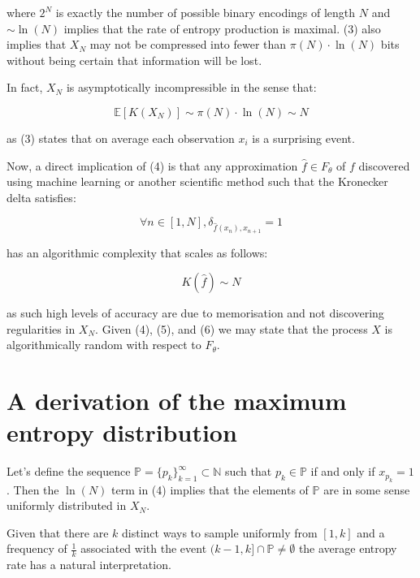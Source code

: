 \documentclass{article}
\begin{document}
where $2^N$ is exactly the number of possible binary encodings of length $N$ and 
$\sim \ln(N)$ implies that the rate of entropy production is maximal. (3) also implies that $X_N$ may not be compressed into fewer than $\pi(N) \cdot \ln(N)$ bits without being certain that information will be lost. 

In fact, $X_N$ is asymptotically incompressible in the sense that: 

\begin{equation}
\mathbb{E}[K(X_N)] \sim 	\pi(N) \cdot \ln(N) \sim N
\end{equation}

as (3) states that on average each observation $x_i$ is a surprising event.

\newpage  

Now, a direct implication of (4) is that any approximation $\hat{f} \in F_{\theta}$ of $f$ discovered using machine learning or another scientific 
method such that the Kronecker delta satisfies: 

\begin{equation}
\forall n \in [1,N], \delta_{\hat{f}(x_n),x_{n+1}} = 1	
\end{equation}

has an algorithmic complexity that scales as follows: 

\begin{equation}
K(\hat{f}) \sim N	
\end{equation}

as such high levels of accuracy are due to memorisation and not discovering 
regularities in $X_N$. Given (4), (5), and (6) we may state that the process $X$ is algorithmically 
random with respect to $F_{\theta}$. 

\section{A derivation of the maximum entropy distribution}

Let's define the sequence $\mathbb{P} = \{p_k\}_{k=1}^\infty \subset \mathbb{N}$
such that $p_k \in \mathbb{P}$ if and only if $x_{p_k} = 1$. Then the $\ln(N)$ term in 
(4) implies that the elements of $\mathbb{P}$ are in some sense uniformly distributed in $X_N$. 

Given that there are $k$ distinct ways to sample uniformly from $[1,k]$ and a frequency of $\frac{1}{k}$ associated with the event $(k-1,k] \cap \mathbb{P} \neq \emptyset$ the average entropy rate has a natural interpretation. 
\end{document}
